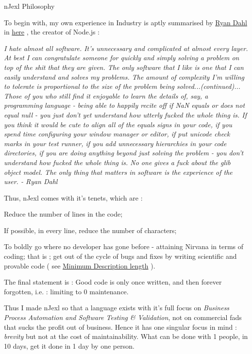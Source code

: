 \begin{section}{nJexl Philosophy}

To begin with, my own experience in Industry is aptly summarised by \href{https://en.wikipedia.org/wiki/Node.js}{Ryan Dahl}
in \href{http://harmful.cat-v.org/software/node.js}{here} , the creator of Node.js :

\begin{center}
\emph{
I hate almost all software. It's unnecessary and complicated at almost every layer. At best I can congratulate someone for quickly and simply solving a problem on top of the shit that they are given. The only software that I like is one that I can easily understand and solves my problems. The amount of complexity I'm willing to tolerate is proportional to the size of the problem being solved...(continued)...
Those of you who still find it enjoyable to learn the details of, say, a programming language - being able to happily recite off if NaN equals or does not equal null - you just don't yet understand how utterly fucked the whole thing is. If you think it would be cute to align all of the equals signs in your code, if you spend time configuring your window manager or editor, if put unicode check marks in your test runner, if you add unnecessary hierarchies in your code directories, if you are doing anything beyond just solving the problem - you don't understand how fucked the whole thing is. No one gives a fuck about the glib object model.
\emph{The only thing that matters in software is the experience of the user.}   - Ryan Dahl
}
\end{center}

Thus, nJexl comes with it's tenets, which are :

\begin{enumerate}
\item{ Reduce the number of lines in the code; }
\item{ If possible, in every line, reduce the number of characters; }
\item{ To boldly go where no developer has gone before - attaining Nirvana in terms of coding;
     that is ; get out of the cycle of bugs and fixes by writing scientific and provable code 
    ( see  \href{http://en.wikipedia.org/wiki/Minimum_description_length}{Minimum Description length} ).
\item{The final statement is : Good code is only once written, and then forever forgotten, i.e. : limiting to 0 maintenance. }    
} 
\end{enumerate}

Thus I made nJexl so that a language exists with it's full focus on \emph{Business Process Automation and Software Testing \& Validation},
not on commercial fads that sucks the profit out of business. Hence it has one singular focus in mind : \emph{brevity} but not at the cost of maintainability. What can be done with 1 people, in 10 days, get it done in 1 day by one person.

\end{section}

